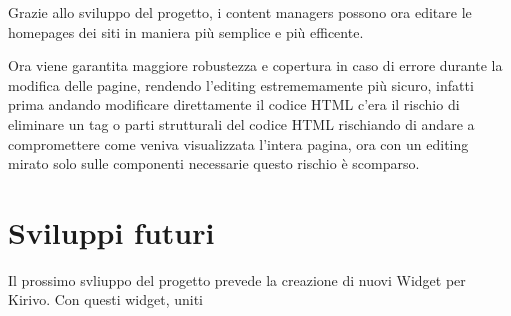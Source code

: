 
Grazie allo sviluppo del progetto, i content managers possono ora editare le
homepages dei siti in maniera più semplice e più efficente.

Ora viene garantita maggiore robustezza e copertura in caso di errore durante la modifica delle pagine,
rendendo l'editing estrememamente più sicuro, infatti prima andando modificare direttamente il codice HTML c'era il rischio di eliminare
un tag o parti strutturali del codice HTML rischiando di andare a compromettere come veniva visualizzata l'intera pagina,
ora con un editing mirato solo sulle componenti necessarie questo rischio è scomparso.

\section{Sviluppi futuri}

Il prossimo svliuppo del progetto prevede la creazione di nuovi Widget per Kirivo. Con questi
widget, uniti